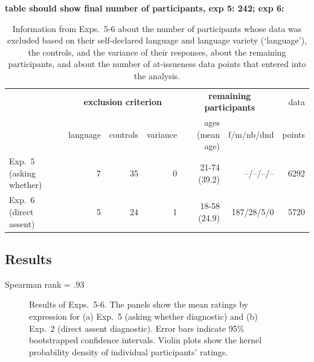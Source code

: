 \documentclass[times,linguex,xcolor]{glossa}
\begin{document}
{\bf table should show final number of participants, exp 5: 242; exp 6: }
  
\begin{table}[h!]
  \centering
  \begin{tabular}{l | r r r | r r  | r }
               & \multicolumn{3}{c|}{\bf exclusion criterion} & \multicolumn{2}{c|}{\bf remaining participants} & data \\ 
              & language & controls & variance & ages (mean age) & f/m/nb/dnd &  points \\ \hline
  Exp.~5 (asking whether)  & 7 &  35 & 0 &  21-74 (39.2) & --/--/--/-- & 6292 \\ 
  Exp.~6 (direct assent) &  5 &  24 & 1 & 18-58 (24.9) & 187/28/5/0 & 5720 \\ 
  \hline
  \end{tabular}
  \caption{Information from Exps.~5-6 about the number of participants whose data was excluded based on their self-declared language and language variety (`language'), the controls, and the variance of their responses, about the remaining participants, and about the number of at-issueness data points that entered into the analysis.}\label{t:excluded2}
  \end{table}

  \subsection{Results}
  
  Spearman rank = .93

  \begin{figure}[h!]
    \centering
    


    \caption{Results of Exps.~5-6. The panels show the mean ratings by expression for (a) Exp.~5 (asking whether diagnostic) and (b) Exp.~2 (direct assent diagnostic). Error bars indicate 95\% bootstrapped confidence intervals. Violin plots show the kernel probability density of individual participants' ratings.}
    \label{fig:results2}
  \end{figure}
  
\end{document}
